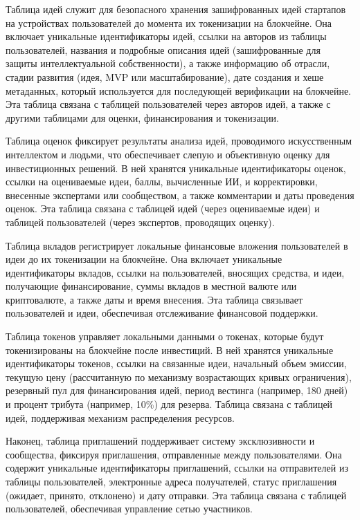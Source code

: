 \documentclass[
    candidate, %
    subf, %
    dotsinheaders=false,
]{disser}
\begin{document}
Таблица идей служит для безопасного хранения зашифрованных идей стартапов на устройствах пользователей до момента их токенизации на блокчейне. Она включает уникальные идентификаторы идей, ссылки на авторов из таблицы пользователей, названия и подробные описания идей (зашифрованные для защиты интеллектуальной собственности), а также информацию об отрасли, стадии развития (идея, MVP или масштабирование), дате создания и хеше метаданных, который используется для последующей верификации на блокчейне. Эта таблица связана с таблицей пользователей через авторов идей, а также с другими таблицами для оценки, финансирования и токенизации.

Таблица оценок фиксирует результаты анализа идей, проводимого искусственным интеллектом и людьми, что обеспечивает слепую и объективную оценку для инвестиционных решений. В ней хранятся уникальные идентификаторы оценок, ссылки на оцениваемые идеи, баллы, вычисленные ИИ, и корректировки, внесенные экспертами или сообществом, а также комментарии и даты проведения оценок. Эта таблица связана с таблицей идей (через оцениваемые идеи) и таблицей пользователей (через экспертов, проводящих оценку).

Таблица вкладов регистрирует локальные финансовые вложения пользователей в идеи до их токенизации на блокчейне. Она включает уникальные идентификаторы вкладов, ссылки на пользователей, вносящих средства, и идеи, получающие финансирование, суммы вкладов в местной валюте или криптовалюте, а также даты и время внесения. Эта таблица связывает пользователей и идеи, обеспечивая отслеживание финансовой поддержки.

Таблица токенов управляет локальными данными о токенах, которые будут токенизированы на блокчейне после инвестиций. В ней хранятся уникальные идентификаторы токенов, ссылки на связанные идеи, начальный объем эмиссии, текущую цену (рассчитанную по механизму возрастающих кривых ограничения), резервный пул для финансирования идей, период вестинга (например, 180 дней) и процент трибута (например, 10\%) для резерва. Таблица связана с таблицей идей, поддерживая механизм распределения ресурсов.

Наконец, таблица приглашений поддерживает систему эксклюзивности и сообщества, фиксируя приглашения, отправленные между пользователями. Она содержит уникальные идентификаторы приглашений, ссылки на отправителей из таблицы пользователей, электронные адреса получателей, статус приглашения (ожидает, принято, отклонено) и дату отправки. Эта таблица связана с таблицей пользователей, обеспечивая управление сетью участников.
\end{document}
